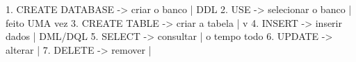 \begin{frame}[fragile]{}
  \vspace{0.8em}
  \begin{sql}
1. CREATE DATABASE  ->  criar o banco       | DDL
2. USE              ->  selecionar o banco  | feito UMA vez
3. CREATE TABLE     ->  criar a tabela      |
                    v
4. INSERT           ->  inserir dados       | DML/DQL
5. SELECT           ->  consultar           | o tempo todo
6. UPDATE           ->  alterar             |
7. DELETE           ->  remover             |
  \end{sql}

  \vspace{0.8em}
  \begin{center}
  \end{center}

\end{frame}

